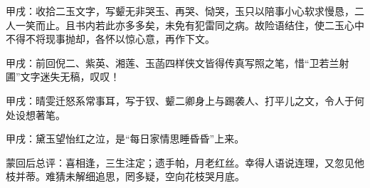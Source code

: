 \begin{parag}
    \begin{note}甲戌：收拾二玉文字，写颦无非哭玉、再哭、恸哭，玉只以陪事小心软求慢恳，二人一笑而止。且书内若此亦多多矣，未免有犯雷同之病。故险语结住，使二玉心中不得不将现事抛却，各怀以惊心意，再作下文。\end{note}
\end{parag}


\begin{parag}
    \begin{note}甲戌：前回倪二、紫英、湘莲、玉菡四样侠文皆得传真写照之笔，惜“卫若兰射圃”文字迷失无稿，叹叹！\end{note}
\end{parag}


\begin{parag}
    \begin{note}甲戌：晴雯迁怒系常事耳，写于钗、颦二卿身上与踢袭人、打平儿之文，令人于何处设想著笔。\end{note}
\end{parag}


\begin{parag}
    \begin{note}甲戌：黛玉望怡红之泣，是“每日家情思睡昏昏”上来。\end{note}
\end{parag}


\begin{parag}
    \begin{note}蒙回后总评：喜相逢，三生注定；遗手帕，月老红丝。幸得人语说连理，又忽见他枝并蒂。难猜未解细追思，罔多疑，空向花枝哭月底。\end{note}
\end{parag}

